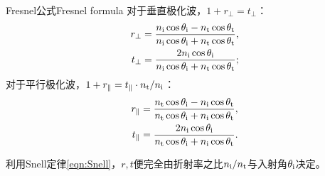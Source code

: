 \begin{theorem}
    {Fresnel公式}{Fresnel formula}
    对于垂直极化波，$1 + r_\perp = t_\perp$：
    \begin{subequations}
        \begin{align}
            \label{eqn:Fresnel rperp}
            r_\perp &= \frac{n_\incident\cos\theta_\incident - n_\transmitted\cos\theta_\transmitted}{n_\incident\cos\theta_\incident + n_\transmitted\cos\theta_\transmitted},\\%
            \label{eqn:Fresnel tperp}
            t_\perp &= \frac{2n_\incident\cos\theta_\incident}{n_\incident\cos\theta_\incident + n_\transmitted\cos\theta_\transmitted};%
        \end{align}
    \end{subequations}
    对于平行极化波，$1 + r_\parallel = t_\parallel \cdot n_\mathrm t/n_\mathrm i$：
    \begin{subequations}
        \begin{align}
            \label{eqn:Fresnel rpara}
            r_\parallel &= \frac{n_\mathrm t\cos\theta_\mathrm i - n_\mathrm i\cos\theta_\mathrm t}{n_\mathrm t\cos\theta_\mathrm i + n_\mathrm i\cos\theta_\mathrm t},\\
            \label{eqn:Fresnel tpara}
            t_\parallel &= \frac{2n_\mathrm i\cos\theta_\mathrm i}{n_\mathrm t\cos\theta_\mathrm i + n_\mathrm i\cos\theta_\mathrm t}.
        \end{align}
    \end{subequations}
\end{theorem}
    
利用Snell定律\eqref{eqn:Snell}，$r,t$便完全由折射率之比$n_\mathrm i/n_\mathrm t$与入射角$\theta_\mathrm i$决定。

